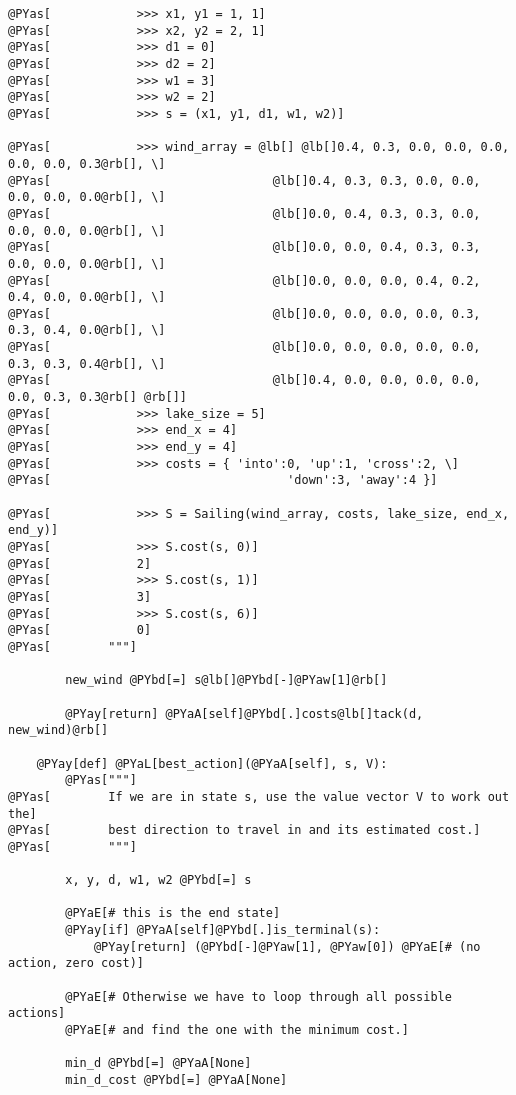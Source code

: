 \begin{Verbatim}[commandchars=@\[\]]
@PYas[            >>> x1, y1 = 1, 1]
@PYas[            >>> x2, y2 = 2, 1]
@PYas[            >>> d1 = 0]
@PYas[            >>> d2 = 2]
@PYas[            >>> w1 = 3]
@PYas[            >>> w2 = 2]
@PYas[            >>> s = (x1, y1, d1, w1, w2)]

@PYas[            >>> wind_array = @lb[] @lb[]0.4, 0.3, 0.0, 0.0, 0.0, 0.0, 0.0, 0.3@rb[], \]
@PYas[                               @lb[]0.4, 0.3, 0.3, 0.0, 0.0, 0.0, 0.0, 0.0@rb[], \]
@PYas[                               @lb[]0.0, 0.4, 0.3, 0.3, 0.0, 0.0, 0.0, 0.0@rb[], \]
@PYas[                               @lb[]0.0, 0.0, 0.4, 0.3, 0.3, 0.0, 0.0, 0.0@rb[], \]
@PYas[                               @lb[]0.0, 0.0, 0.0, 0.4, 0.2, 0.4, 0.0, 0.0@rb[], \]
@PYas[                               @lb[]0.0, 0.0, 0.0, 0.0, 0.3, 0.3, 0.4, 0.0@rb[], \]
@PYas[                               @lb[]0.0, 0.0, 0.0, 0.0, 0.0, 0.3, 0.3, 0.4@rb[], \]
@PYas[                               @lb[]0.4, 0.0, 0.0, 0.0, 0.0, 0.0, 0.3, 0.3@rb[] @rb[]]
@PYas[            >>> lake_size = 5]
@PYas[            >>> end_x = 4]
@PYas[            >>> end_y = 4]
@PYas[            >>> costs = { 'into':0, 'up':1, 'cross':2, \]
@PYas[                                 'down':3, 'away':4 }]

@PYas[            >>> S = Sailing(wind_array, costs, lake_size, end_x, end_y)]
@PYas[            >>> S.cost(s, 0)]
@PYas[            2]
@PYas[            >>> S.cost(s, 1)]
@PYas[            3]
@PYas[            >>> S.cost(s, 6)]
@PYas[            0]
@PYas[        """]

        new_wind @PYbd[=] s@lb[]@PYbd[-]@PYaw[1]@rb[]

        @PYay[return] @PYaA[self]@PYbd[.]costs@lb[]tack(d, new_wind)@rb[]

    @PYay[def] @PYaL[best_action](@PYaA[self], s, V):
        @PYas["""]
@PYas[        If we are in state s, use the value vector V to work out the]
@PYas[        best direction to travel in and its estimated cost.]
@PYas[        """]

        x, y, d, w1, w2 @PYbd[=] s

        @PYaE[# this is the end state]
        @PYay[if] @PYaA[self]@PYbd[.]is_terminal(s):
            @PYay[return] (@PYbd[-]@PYaw[1], @PYaw[0]) @PYaE[# (no action, zero cost)]

        @PYaE[# Otherwise we have to loop through all possible actions]
        @PYaE[# and find the one with the minimum cost.]

        min_d @PYbd[=] @PYaA[None]
        min_d_cost @PYbd[=] @PYaA[None]


\end{Verbatim}
